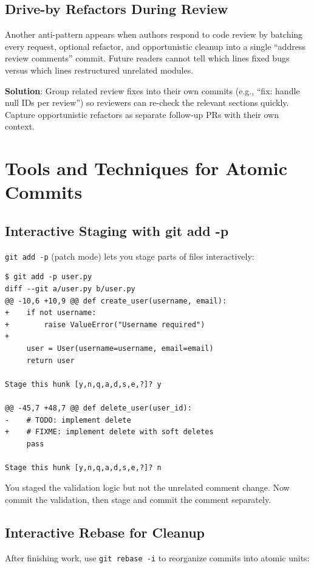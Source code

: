 \subsection{Drive-by Refactors During Review}
Another anti-pattern appears when authors respond to code review by batching every request, optional refactor, and opportunistic cleanup into a single ``address review comments'' commit. Future readers cannot tell which lines fixed bugs versus which lines restructured unrelated modules.

\begin{warningbox}
\textbf{Solution}: Group related review fixes into their own commits (e.g., ``fix: handle null IDs per review'') so reviewers can re-check the relevant sections quickly. Capture opportunistic refactors as separate follow-up PRs with their own context.
\end{warningbox}

\section{Tools and Techniques for Atomic Commits}

\subsection{Interactive Staging with git add -p}
\texttt{git add -p} (patch mode) lets you stage parts of files interactively:

\begin{lstlisting}[style=shell,caption={Interactive staging workflow}]
$ git add -p user.py
diff --git a/user.py b/user.py
@@ -10,6 +10,9 @@ def create_user(username, email):
+    if not username:
+        raise ValueError("Username required")
+
     user = User(username=username, email=email)
     return user

Stage this hunk [y,n,q,a,d,s,e,?]? y

@@ -45,7 +48,7 @@ def delete_user(user_id):
-    # TODO: implement delete
+    # FIXME: implement delete with soft deletes
     pass

Stage this hunk [y,n,q,a,d,s,e,?]? n
\end{lstlisting}

You staged the validation logic but not the unrelated comment change. Now commit the validation, then stage and commit the comment separately.

\subsection{Interactive Rebase for Cleanup}
After finishing work, use \texttt{git rebase -i} to reorganize commits into atomic units:

